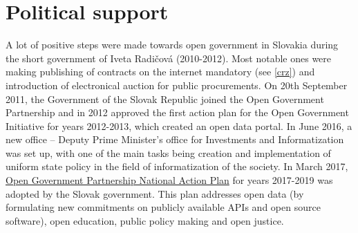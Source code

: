 \documentclass[thesis=B,english]{FITthesis}[2012/06/26]
\begin{document}
	\section{Political support}
	A lot of positive steps were made towards open government in Slovakia during the short government of Iveta Radičová (2010-2012). Most notable ones were making publishing of contracts on the internet mandatory (see \ref{crz}) and introduction of electronical auction for public procurements. On 20th September 2011, the Government of the Slovak Republic joined the Open Government Partnership and in 2012 approved the first  action plan for the Open Government Initiative for years 2012-2013, which created an open data portal. In June 2016, a new  office -- Deputy Prime Minister's office for Investments and Informatization was set up, with one of the main tasks being creation and implementation of uniform state policy in the field of informatization of the society. In March 2017, \href{https://www.opengovpartnership.org/sites/default/files/Slovakia_NAP_2017-2019_EN.pdf}{Open Government Partnership National Action Plan} for years 2017-2019 was adopted by the Slovak government. This plan addresses open data (by formulating new commitments on publicly available APIs and open source software), open education, public policy making and open justice.
\end{document}
